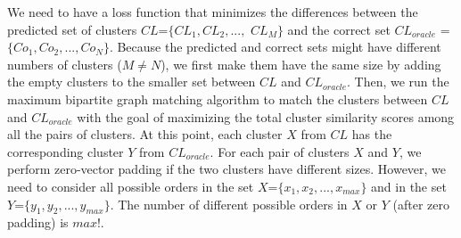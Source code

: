 


We need to have a loss function that minimizes the differences between
the predicted set of clusters $CL$=$\{CL_1,CL_2, ...,$ $CL_M\}$ and
the correct set $CL_{oracle}$ = $\{Co_{1}, Co_{2},...,
Co_{N}\}$. Because the predicted and correct sets might have different
numbers of clusters ($M \neq N$), we first make them have the same
size by adding the empty clusters to the smaller set between $CL$ and
$CL_{oracle}$. Then, we run the maximum bipartite graph matching
algorithm to match the clusters between $CL$ and $CL_{oracle}$ with
the goal of maximizing the total cluster similarity scores among all
the pairs of clusters. At this point, each cluster $X$ from $CL$ has
the corresponding cluster $Y$ from $CL_{oracle}$. For each pair of
clusters $X$ and $Y$, we perform zero-vector padding if the two
clusters have different sizes. However, we need to consider all
possible orders in the set $X$=$\{x_1,x_2,..., x_{max}\}$ and in the
set $Y$=$\{y_1,y_2,...,y_{max}\}$. The number of different possible
orders in $X$ or $Y$ (after zero padding) is $max!$.

